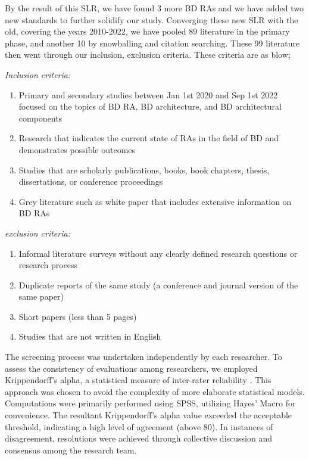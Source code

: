 \documentclass[review]{elsarticle}
\begin{document}
\begin{enumerate}
    By the result of this SLR, we have found 3 more BD RAs \cite{AtaeiApsec,castellanos2021smart,sang2017simplifying} and we have added two new standards \cite{ISO20546,ISO20547} to further solidify our study. Converging these new SLR with the old, covering the years 2010-2022, we have pooled 89 literature in the primary phase, and another 10 by snowballing and citation searching. These 99 literature then went through our inclusion, exclusion criteria. These criteria are as blow;

        \emph{Inclusion criteria:}
        \begin{enumerate}
            \item Primary and secondary studies between Jan 1st 2020 and Sep 1st 2022 focused on the topics of BD RA, BD architecture, and BD architectural components
            \item Research that indicates the current state of RAs in the field of BD and demonstrates possible outcomes
            \item Studies that are scholarly publications, books, book chapters, thesis, dissertations, or conference proceedings 
            \item Grey literature such as white paper that includes extensive information on BD RAs
        \end{enumerate}
        \emph{exclusion criteria:}
        \begin{enumerate}
            \item Informal literature surveys without any clearly defined research questions or research process
            \item Duplicate reports of the same study (a conference and journal version of the same paper)
            \item Short papers (less than 5 pages)
            \item Studies that are not written in English
        \end{enumerate}


\end{enumerate}

The screening process was undertaken independently by each researcher. To assess the consistency of evaluations among researchers, we employed Krippendorff's alpha, a statistical measure of inter-rater reliability \cite{krippendorff2011computing}. This approach was chosen to avoid the complexity of more elaborate statistical models. Computations were primarily performed using SPSS, utilizing Hayes' Macro for convenience. The resultant Krippendorff's alpha value exceeded the acceptable threshold, indicating a high level of agreement (above 80). In instances of disagreement, resolutions were achieved through collective discussion and consensus among the research team.
\end{document}
